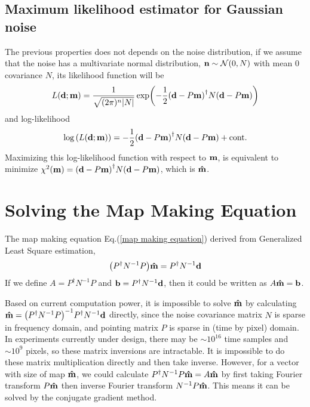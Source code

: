 \documentclass[11pt, letterpaper]{article}
\newcommand{\vbd}{\vb{d}}
\newcommand{\vbm}{\vb{m}}
\newcommand{\vbn}{\vb{n}}
\newcommand{\vbb}{\vb{b}}
\newcommand{\inv}[1]{#1^{-1}}
\newcommand{\hatm}{\vb{\hat{m}}}
\newcommand{\Pdagger}{P^{\dagger}}
\newcommand{\PPinv}[1]{\inv{\qty(\Pdagger #1 P)}}
\begin{document}
\subsection{Maximum likelihood estimator for Gaussian noise}
The previous properties does not depends on the noise distribution, 
if we assume that the noise has a multivariate normal distribution,
$\vbn \sim \mathcal{N}(0, N)$ with mean $0$ covariance $N$,
its likelihood function will be
\begin{align}
L\qty(\vbd;\vbm) = \frac{1}{\sqrt{(2\pi)^n \abs{N}}} 
    \exp(-\frac{1}{2} \qty(\vbd - P\vbm)^{\dagger} N \qty(\vbd - P\vbm))
\end{align}
and log-likelihood
\begin{align}
\log\qty(L\qty(\vbd;\vbm))
= -\frac{1}{2} \qty(\vbd - P\vbm)^{\dagger} N \qty(\vbd - P\vbm) + \text{cont.}  
\end{align}
Maximizing this log-likelihood function with respect to $\vbm$, is equivalent
to minimize $\chi^2(\vbm) =\qty(\vbd - P\vbm)^{\dagger} N \qty(\vbd - P\vbm)$,
which is $\hatm$.

\section{Solving the Map Making Equation}

The map making equation Eq.(\ref{map making equation}) derived from Generalized
Least Square estimation,
\begin{align}
\qty(\Pdagger \inv{N}  P) \hatm = \Pdagger \inv{N} \vbd \label{map making eq}
\end{align}
If we define $A = \Pdagger \inv{N} P$ and $\vbb = \Pdagger \inv{N} \vbd$,
then it could be written as $A\hatm = \vbb$.

Based on current computation power, it is impossible to solve $\hatm$
by calculating $\hatm = \PPinv{\inv{N}} \Pdagger \inv{N} \vbd$ directly,
since the noise covariance matrix $N$ is sparse in frequency domain,
and pointing matrix $P$ is sparse in (time by pixel) domain.  In experiments currently under design, there may be $\sim 10^{16}$ time samples and $\sim 10^{9}$ pixels, so these matrix inversions are intractable.
It is impossible to do these matrix multiplication directly and then take
inverse.
However, for a vector with size of map $\hatm$, we could calculate
$\Pdagger \inv{N} P \hatm = A\hatm$ by first taking Fourier transform $P\hatm$
then inverse Fourier transform $\inv{N}P\hatm$.
This means it can be solved by the conjugate gradient method.
\end{document}
